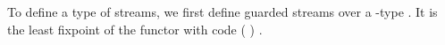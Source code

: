 To define a type of streams, we first define guarded streams over a -type .
It is the least fixpoint of the functor with code  ( )  .
\begin{code}%
\>[0]\AgdaSpace{}%
\AgdaSymbol{:}\AgdaSpace{}%
\AgdaSpace{}%
\AgdaSpace{}%
\AgdaSpace{}%
\AgdaSpace{}%
\<%
\\
\>[0]\AgdaSpace{}%
\AgdaSpace{}%
\AgdaSymbol{=}\AgdaSpace{}%
\AgdaSpace{}%
\AgdaSymbol{(}\AgdaSpace{}%
\AgdaSymbol{(}\AgdaSpace{}%
\AgdaSymbol{)}\AgdaSpace{}%
\AgdaSpace{}%
\AgdaSpace{}%
\AgdaSymbol{)}\<%
\end{code}
